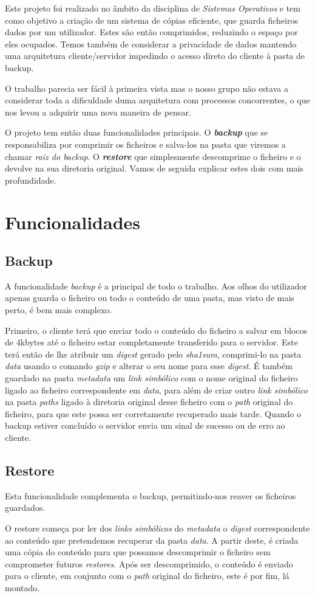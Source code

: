 \documentclass[12pt,a4paper]{report}
\begin{document}
Este projeto foi realizado no âmbito da disciplina de \emph{Sistemas Operativos} e tem como objetivo a criação de um sistema de cópias eficiente, que guarda ficheiros dados por um utilizador. Estes são então comprimidos, reduzindo o espaço por eles ocupados. Temos também de considerar a privacidade de dados mantendo uma arquitetura cliente/servidor impedindo o acesso direto do cliente à pasta de backup.\par
O trabalho parecia ser fácil à primeira vista mas o nosso grupo não estava a considerar toda a dificuldade duma arquitetura com processos concorrentes, o que nos levou a adquirir uma nova maneira de pensar.\par
O projeto tem então duas funcionalidades principais. O \emph{\bfseries{backup}} que se responsabiliza por comprimir os ficheiros e salva-los na pasta que viremos a chamar \emph{raiz do backup}. O \emph{\bfseries{restore}} que simplesmente descomprime o ficheiro e o devolve na sua diretoria original. Vamos de seguida explicar estes dois com mais profundidade.

\chapter{Funcionalidades}
\section{Backup}
A funcionalidade \emph{backup} é a principal de todo o trabalho. Aos olhos do utilizador apenas guarda o ficheiro ou todo o conteúdo de uma pasta, mas visto de mais perto, é bem mais complexo.\par Primeiro, o cliente terá que enviar todo o conteúdo do ficheiro a salvar em blocos de 4kbytes até o ficheiro estar completamente transferido para o servidor. Este terá então de lhe atribuir um \emph{digest} gerado pelo \emph{sha1sum}, comprimi-lo na pasta \emph{data}  usando o comando \emph{gzip} e alterar o seu nome para esse \emph{digest}. É também guardado na pasta \emph{metadata} um \emph{link simbólico} com o nome original do ficheiro ligado ao ficheiro correspondente em \emph{data}, para além de criar outro \emph{link simbólico} na pasta \emph{paths} ligado à diretoria original desse ficheiro com o \emph{path} original do ficheiro, para que este possa ser corretamente recuperado mais tarde. Quando o backup estiver concluído o servidor envia um sinal de sucesso ou de erro ao cliente.

\section{Restore}
Esta funcionalidade complementa o backup, permitindo-nos reaver os ficheiros guardados.\par O restore começa por ler dos \emph{links simbólicos} do \emph{metadata} o \emph{digest} correspondente ao conteúdo que pretendemos recuperar da pasta \emph{data}. A partir deste, é criada uma cópia do conteúdo para que possamos descomprimir o ficheiro sem comprometer futuros \emph{restores}. Após ser descomprimido, o conteúdo é enviado para o cliente, em conjunto com o \emph{path} original do ficheiro, este é por fim, lá montado.
\end{document}
